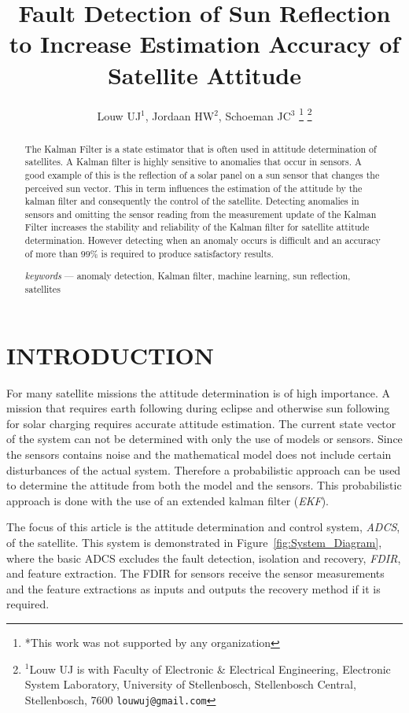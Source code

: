 \documentclass[letterpaper, 10 pt, conference]{ieeeconf}  %
\title{\LARGE \bf
Fault Detection of Sun Reflection to Increase Estimation Accuracy of Satellite Attitude
}
\author{Louw UJ$^{1}$, Jordaan HW$^{2}$, Schoeman JC$^{3}$%
\thanks{*This work was not supported by any organization}%
\thanks{$^{1}$Louw UJ is with Faculty of Electronic \& Electrical Engineering, Electronic System            Laboratory, University of Stellenbosch, Stellenbosch Central, Stellenbosch, 7600
        {\tt\small louwuj@gmail.com}}%
}
\begin{document}
\maketitle
\thispagestyle{empty}
\pagestyle{empty}


\begin{abstract}

The Kalman Filter is a state estimator that is often used in attitude determination of satellites. A Kalman filter is highly sensitive to anomalies that occur in sensors. A good example of this is the reflection of a solar panel on a sun sensor that changes the perceived sun vector. This in term influences the estimation of the attitude by the kalman filter and consequently the control of the satellite. Detecting anomalies in sensors and omitting the sensor reading from the measurement update of the Kalman Filter increases the stability and reliability of the Kalman filter for satellite attitude determination. However detecting when an anomaly occurs is difficult and an accuracy of more than $99\%$ is required to produce satisfactory results.

\emph{keywords} --- anomaly detection, Kalman filter, machine learning, sun reflection, satellites

\end{abstract}


\section{INTRODUCTION}
For many satellite missions the attitude determination is of high importance. A mission that requires earth following during eclipse and otherwise sun following for solar charging requires accurate attitude estimation. The current state vector of the system can not be determined with only the use of models or sensors. Since the sensors contains noise and the mathematical model does not include certain disturbances of the actual system. Therefore a probabilistic approach can be used to determine the attitude from both the model and the sensors. This probabilistic approach is done with the use of an extended kalman filter (\emph{EKF}). 

The focus of this article is the attitude determination and control system, \emph{ADCS}, of the satellite. This system is demonstrated in Figure~\ref{fig:System_Diagram}, where the basic ADCS excludes the fault detection, isolation and recovery, \emph{FDIR}, and feature extraction. The FDIR for sensors receive the sensor measurements and the feature extractions as inputs and outputs the recovery method if it is required. 
\end{document}
